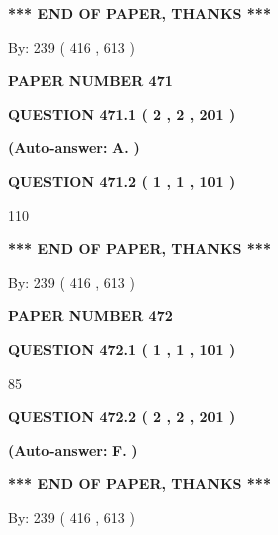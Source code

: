 \documentclass{ctexart}
\begin{document}
 
   
   
   
   
\vspace{1.0in} 
{\textbf{\large{ *** END OF PAPER, THANKS *** }}} 
   
   
\hspace{1.0in} By: 
 239 ( 416 ,  613 )
   
   
   
   
\newpage 
\setcounter{page}{ 
   471001 } 
   
   
 {\textbf{ \Large{ PAPER NUMBER  471  }}}
   
   
   
   
  
  
{\textbf{\large{QUESTION
471.1 
 ( 2 , 2 , 201 )
}}}
 
 
{\textbf{(Auto-answer:}}
{\textbf{\large{
A.}}}
{\textbf{)}}
 
 
  
  
{\textbf{\large{QUESTION
471.2 
 ( 1 , 1 , 101 )
}}}

110
   
   
   
   
\vspace{1.0in} 
{\textbf{\large{ *** END OF PAPER, THANKS *** }}} 
   
   
\hspace{1.0in} By: 
 239 ( 416 ,  613 )
   
   
   
   
\newpage 
\setcounter{page}{ 
   472001 } 
   
   
 {\textbf{ \Large{ PAPER NUMBER  472  }}}
   
   
   
   
  
  
{\textbf{\large{QUESTION
472.1 
 ( 1 , 1 , 101 )
}}}

85
  
  
{\textbf{\large{QUESTION
472.2 
 ( 2 , 2 , 201 )
}}}
 
 
{\textbf{(Auto-answer:}}
{\textbf{\large{
F.}}}
{\textbf{)}}
 
 
   
   
   
   
\vspace{1.0in} 
{\textbf{\large{ *** END OF PAPER, THANKS *** }}} 
   
   
\hspace{1.0in} By: 
 239 ( 416 ,  613 )
   
   
   
   
\newpage 
\setcounter{page}{ 
   473001 } 
   
\end{document}
